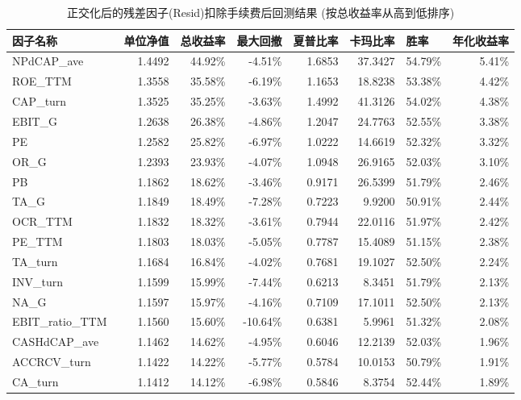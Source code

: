 \documentclass[11pt]{article}
\begin{document}
\begin{table}[htbp]
  \centering
  \caption{正交化后的残差因子(Resid)扣除手续费后回测结果 (按总收益率从高到低排序)}
    \begin{tabular}{lrrrrrrr}
    \toprule
    因子名称  & \multicolumn{1}{l}{单位净值} & \multicolumn{1}{l}{总收益率} & \multicolumn{1}{l}{最大回撤} & \multicolumn{1}{l}{夏普比率} & \multicolumn{1}{l}{卡玛比率} & \multicolumn{1}{l}{胜率} & \multicolumn{1}{l}{年化收益率} \\
    \midrule
    NPdCAP\_ave\ & 1.4492  & 44.92\% & -4.51\% & 1.6853  & 37.3427  & 54.79\% & 5.41\% \\
    ROE\_TTM\ & 1.3558  & 35.58\% & -6.19\% & 1.1653  & 18.8238  & 53.38\% & 4.42\% \\
    CAP\_turn\ & 1.3525  & 35.25\% & -3.63\% & 1.4992  & 41.3126  & 54.02\% & 4.38\% \\
    EBIT\_G\ & 1.2638  & 26.38\% & -4.86\% & 1.2047  & 24.7763  & 52.55\% & 3.38\% \\
    PE\ & 1.2582  & 25.82\% & -6.97\% & 1.0222  & 14.6619  & 52.32\% & 3.32\% \\
    OR\_G\ & 1.2393  & 23.93\% & -4.07\% & 1.0948  & 26.9165  & 52.03\% & 3.10\% \\
    PB\ & 1.1862  & 18.62\% & -3.46\% & 0.9171  & 26.5399  & 51.79\% & 2.46\% \\
    TA\_G\ & 1.1849  & 18.49\% & -7.28\% & 0.7223  & 9.9200  & 50.91\% & 2.44\% \\
    OCR\_TTM\ & 1.1832  & 18.32\% & -3.61\% & 0.7944  & 22.0116  & 51.97\% & 2.42\% \\
    PE\_TTM\ & 1.1803  & 18.03\% & -5.05\% & 0.7787  & 15.4089  & 51.15\% & 2.38\% \\
    TA\_turn\ & 1.1684  & 16.84\% & -4.02\% & 0.7681  & 19.1027  & 52.50\% & 2.24\% \\
    INV\_turn\ & 1.1599  & 15.99\% & -7.44\% & 0.6213  & 8.3451  & 51.79\% & 2.13\% \\
    NA\_G\ & 1.1597  & 15.97\% & -4.16\% & 0.7109  & 17.1011  & 52.50\% & 2.13\% \\
    EBIT\_ratio\_TTM\ & 1.1560  & 15.60\% & -10.64\% & 0.6381  & 5.9961  & 51.32\% & 2.08\% \\
    CASHdCAP\_ave\ & 1.1462  & 14.62\% & -4.95\% & 0.6046  & 12.2139  & 52.03\% & 1.96\% \\
    ACCRCV\_turn\ & 1.1422  & 14.22\% & -5.77\% & 0.5784  & 10.0153  & 50.79\% & 1.91\% \\
    CA\_turn\ & 1.1412  & 14.12\% & -6.98\% & 0.5846  & 8.3754  & 52.44\% & 1.89\% \\

\end{tabular}
\end{table}
\end{document}
